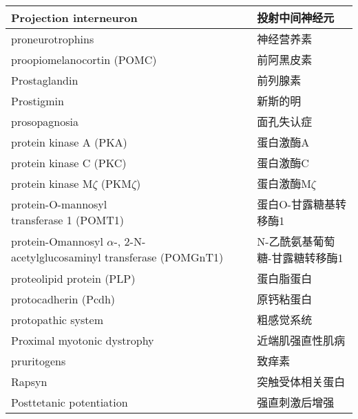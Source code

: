 \begin{longtable}{lll}
	\midrule
	Projection interneuron   && 投射中间神经元  \\
	
	\midrule
	proneurotrophins   && 神经营养素  \\
	
	\midrule
	proopiomelanocortin (POMC)  && 前阿黑皮素  \\
	
	\midrule
	Prostaglandin   && 前列腺素  \\
	
	\midrule
	Prostigmin   && 新斯的明  \\
	
	\midrule
	prosopagnosia   && 面孔失认症  \\
	
	\midrule
	protein kinase A (PKA)   && 蛋白激酶A  \\
	
	\midrule
	protein kinase C (PKC)   && 蛋白激酶C  \\
	
	\midrule
	protein kinase M$\zeta$ (PKM$\zeta$)   && 蛋白激酶M$\zeta$  \\
	
	\midrule
	\makecell[l]{protein-O-mannosyl \\ transferase 1 (POMT1)}     && 蛋白O-甘露糖基转移酶1   \\
	
	\midrule
	\makecell[l]{protein-Omannosyl $\alpha$-,\\2-N-acetylglucosaminyl transferase (POMGnT1)}     && N-乙酰氨基葡萄糖-甘露糖转移酶1  \\
	
	\midrule
	proteolipid protein (PLP)   && 蛋白脂蛋白  \\
	
	\midrule
	protocadherin (Pcdh)  && 原钙粘蛋白  \\
	
	\midrule
	protopathic system   && 粗感觉系统  \\
	
	\midrule
	Proximal myotonic dystrophy   && 近端肌强直性肌病  \\
	
	\midrule
	pruritogens  && 致痒素  \\
	
	\midrule
	Rapsyn   && 突触受体相关蛋白  \\
	
	\midrule
	Posttetanic potentiation   && 强直刺激后增强  \\
	

\end{longtable}
